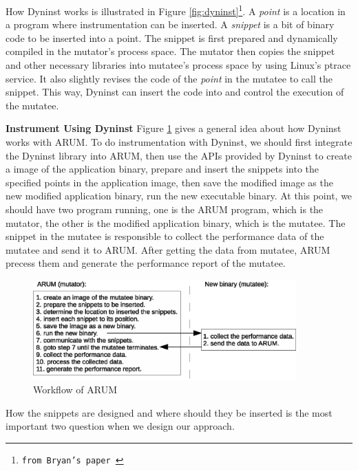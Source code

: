 \documentclass[11pt,letterpaper,oneside]{article}
\begin{document}
How Dyninst works is illustrated in Figure \ref{fig:dyninst}\footnote{\texttt{from Bryan's paper \cite{bib:anapi}}}. A \emph{point} is a location in a program where instrumentation can be inserted. A \emph{snippet} is a bit of binary code to be inserted into a point. The snippet is first prepared and dynamically compiled in the mutator's process space. The mutator then copies the snippet and other necessary libraries into mutatee's process space by using Linux's ptrace service. It also slightly revises the code of the \emph{point} in the mutatee to call the snippet. This way, Dyninst can insert the code into and control the execution of the mutatee.

\noindent \newline\textbf{Instrument Using Dyninst}\newline
\indent Figure \ref{fig:workflow} gives a general idea about how Dyninst works with ARUM. To do instrumentation with Dyninst, we should first integrate the Dyninst library into ARUM, then use the APIs provided by Dyninst to create a image of the application binary, prepare and insert the snippets into the specified points in the application image, then save the modified image as the new modified application binary, run the new executable binary. At this point, we should have two program running, one is the ARUM program, which is the mutator, the other is the modified application binary, which is the mutatee. The snippet in the mutatee is responsible to collect the performance data of the mutatee and send it to ARUM. After getting the data from mutatee, ARUM precess them and generate the performance report of the mutatee.

\begin{figure}
\begin{center}
\includegraphics[width=0.9\textwidth]{workflow.eps}
\caption{Workflow of ARUM}
\label{fig:workflow}
\end{center}
\end{figure}

How the snippets are designed and where should they be inserted is the most important two question when we design our approach. 
\end{document}
